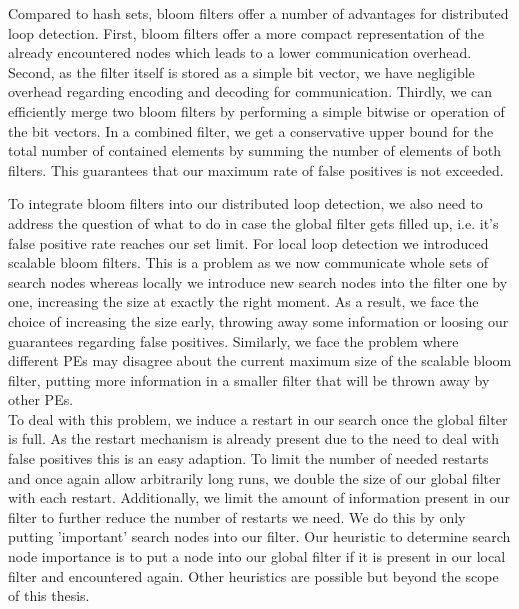 Compared to hash sets, bloom filters offer a number of advantages for distributed loop detection. First, bloom filters offer a more compact representation of the already encountered nodes which leads to a lower communication overhead. Second, as the filter itself is stored as a simple bit vector, we have negligible overhead regarding encoding and decoding for communication. Thirdly, we can efficiently merge two bloom filters by performing a simple bitwise or operation of the bit vectors. In a combined filter, we get a conservative upper bound for the total number of contained elements by summing the number of elements of both filters. This guarantees that our maximum rate of false positives is not exceeded. \\
\begin{comment}
- bloom filters have additional advantages:
- smaller size makes them efficient to communicate
- also, encoding and decoding for communication is trivial as the filter consists of a simple bit vector
- bloom filters can be merged efficiently via bitwise operations
- bloom filters are shared between all workers by regularly performing a distributed reduction operation with a subsequent broadcast afterwards
- this takes logarithmic number of steps in the number of workers
- this gives us some global loop detection capabilities back
- we approximate the number of search nodes contained in the global filter as the sum of nodes in our communicated filters, this gives us a conservative upper bound which guarantees that our bounds for false positives are not violated
\end{comment}
To integrate bloom filters into our distributed loop detection, we also need to address the question of what to do in case the global filter gets filled up, i.e. it's false positive rate reaches our set limit. For local loop detection we introduced scalable bloom filters.
This is a problem as we now communicate whole sets of search nodes whereas locally we introduce new search nodes into the filter one by one, increasing the size at exactly the right moment. As a result, we face the choice of increasing the size early, throwing away some information or loosing our guarantees regarding false positives. Similarly, we face the problem where different PEs may disagree about the current maximum size of the scalable bloom filter, putting more information in a smaller filter that will be thrown away by other PEs. \\
To deal with this problem, we induce a restart in our search once the global filter is full. As the restart mechanism is already present due to the need to deal with false positives this is an easy adaption. To limit the number of needed restarts and once again allow arbitrarily long runs, we double the size of our global filter with each restart. Additionally, we limit the amount of information present in our filter to further reduce the number of restarts we need. We do this by only putting 'important' search nodes into our filter. Our heuristic to determine search node importance is to put a node into our global filter if it is present in our local filter and encountered again. Other heuristics are possible but beyond the scope of this thesis.
